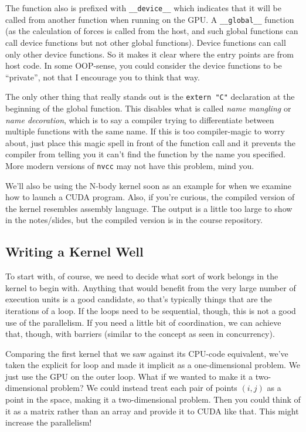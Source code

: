 The function also is prefixed with \texttt{\_\_device\_\_} which indicates that it will be called from another function when running on the GPU. A \texttt{\_\_global\_\_} function (as the calculation of forces is called from the host, and such global functions can call device functions but not other global functions). Device functions can call only other device functions. So it makes it clear where the entry points are from host code. In some OOP-sense, you could consider the device functions to be ``private'', not that I encourage you to think that way.

The only other thing that really stands out is the \texttt{extern "C"} declaration at the beginning of the global function. This disables what is called \textit{name mangling} or \textit{name decoration}, which is to say a compiler trying to differentiate between multiple functions with the same name. If this is too compiler-magic to worry about, just place this magic spell in front of the function call and it prevents the compiler from telling you it can't find the function by the name you specified. More modern versions of \texttt{nvcc} may not have this problem, mind you.

We'll also be using the N-body kernel soon as an example for when we examine how to launch a CUDA program. Also, if you're curious, the compiled version of the kernel resembles assembly language. The output is a little too large to show in the notes/slides, but the compiled version is in the course repository.

\subsection*{Writing a Kernel Well}

To start with, of course, we need to decide what sort of work belongs in the kernel to begin with. Anything that would benefit from the very large number of execution units is a good candidate, so that's typically things that are the iterations of a loop. If the loops need to be sequential, though, this is not a good use of the parallelism. If you need a little bit of coordination, we can achieve that, though, with barriers (similar to the concept as seen in concurrency). 

Comparing the first kernel that we saw against its CPU-code equivalent, we've taken the explicit for loop and made it implicit as a one-dimensional problem. We just use the GPU on the outer loop. What if we wanted to make it a two-dimensional problem? We could instead treat each pair of points $(i, j)$ as a point in the space, making it a two-dimensional problem. Then you could think of it as a matrix rather than an array and provide it to CUDA like that. This might increase the parallelism! 

